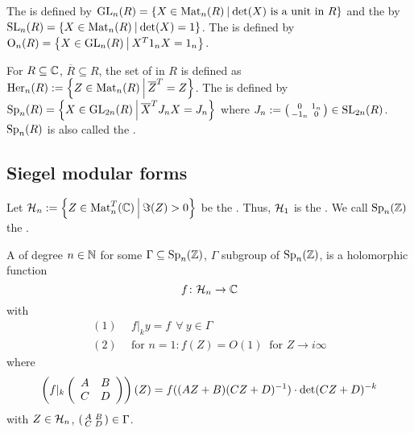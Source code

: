 The  is defined by $\GL_n(R) = \Set{X \in \M_n(R)}{\text{$\det(X)$ is a unit in $R$}}$
and the  by $\SL_n(R) = \Set{X \in \M_n(R)}{\det(X) = 1}$. %
The  is defined by $\Orth_n(R) = \Set{X \in \GL_n(R)}{X^T 1_n X = 1_n}$. %

For $R \subseteq \mathbb{C}$, $\overline{R} \subseteq R$, the set of  in $R$ is defined as $\Her_n(R) := \Set{Z \in \M_n(R)}{\overline{Z}^T = Z}$.
The  is defined by $\Sp_n(R) = \Set{X \in \GL_{2n}(R)}{\overline{X}^T J_n X = J_n}$ %
where $J_n := \left( \begin{smallmatrix} 0 & 1_n \\ -1_n & 0 \end{smallmatrix} \right) \in \operatorname{SL}_{2n}(R)$. %
$\operatorname{Sp}_n(R)$ is also called the .

\subsection{Siegel modular forms}

Let $\SiegelHalfPlane_n := \Set{Z \in \M_n^T(\C)}{\Im(Z) > 0}$ be the .
Thus, $\mathcal{H}_1$ is the .
We call $\operatorname{Sp}_n(\mathbb{Z})$ the .


A  of degree $n\in\mathbb{N}$ for some $\Gamma \subseteq \operatorname{Sp}_n(\mathbb{Z})$, $\Gamma$ subgroup of $\operatorname{Sp}_n(\mathbb{Z})$, is a holomorphic function
\[ f \colon \mathcal{H}_n \rightarrow \mathbb{C} \]
with
\begin{align*}
(1) \ \ & f |_k y = f \ \ \forall \ y \in \Gamma \\
(2) \ \ & \text{for } n = 1 \colon f(Z) = O(1) \ \text{ for } Z \rightarrow i \infty
\end{align*}
where
\[ \left( f|_k \left( \begin{array}{cc} A & B \\ C & D \end{array} \right) \right) (Z) =
f((AZ + B)(CZ + D)^{-1}) \cdot \det(CZ + D)^{-k} \]
with $Z \in \mathcal{H}_n$, $\left( \begin{smallmatrix} A & B \\ C & D \end{smallmatrix} \right) \in \Gamma$.

